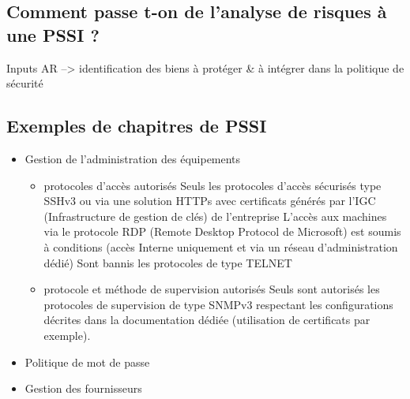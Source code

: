 \subsection{Comment passe t-on de l’analyse de risques à une PSSI ?}

Inputs AR --> identification des biens à protéger \& à intégrer dans la politique de sécurité



\subsection{Exemples de chapitres de PSSI}


\begin{itemize}
    \item Gestion de l’administration des équipements
    \begin{itemize}
        \item protocoles d’accès autorisés
        Seuls les protocoles d'accès sécurisés type SSHv3 ou via une solution HTTPs avec certificats générés par l'IGC (Infrastructure de gestion de clés) de l'entreprise
        L'accès aux machines via le protocole RDP (Remote Desktop Protocol de Microsoft) est soumis à conditions (accès Interne uniquement et via un réseau d'administration dédié)
        Sont bannis les protocoles de type TELNET
        \item protocole et méthode de supervision autorisés
        Seuls sont autorisés les protocoles de supervision de type SNMPv3 respectant les configurations décrites dans la documentation dédiée (utilisation de certificats par exemple).
    \end{itemize}
    \item Politique de mot de passe
    \item Gestion des fournisseurs
\end{itemize}


